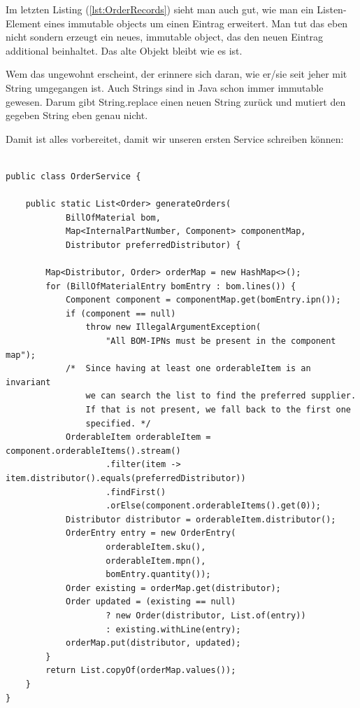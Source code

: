 Im letzten Listing (\ref{lst:OrderRecords}) sieht man auch gut, wie man ein 
Listen-Element eines immutable objects um einen Eintrag erweitert.
Man tut das eben nicht sondern erzeugt ein neues, immutable object, das den
neuen Eintrag additional beinhaltet. Das alte Objekt bleibt wie es ist.

Wem das ungewohnt erscheint, der erinnere sich daran, wie er/sie
seit jeher mit String umgegangen ist. Auch Strings sind in Java schon immer
immutable gewesen. Darum gibt String.replace einen neuen String zurück und 
mutiert den gegeben String eben genau nicht.

Damit ist alles vorbereitet, damit wir unseren ersten Service schreiben können:
\begin{listing}[H]
\begin{verbatim}

public class OrderService {

    public static List<Order> generateOrders(
            BillOfMaterial bom,
            Map<InternalPartNumber, Component> componentMap,
            Distributor preferredDistributor) {

        Map<Distributor, Order> orderMap = new HashMap<>();
        for (BillOfMaterialEntry bomEntry : bom.lines()) {
            Component component = componentMap.get(bomEntry.ipn());
            if (component == null) 
                throw new IllegalArgumentException(
                    "All BOM-IPNs must be present in the component map");
            /*  Since having at least one orderableItem is an invariant
                we can search the list to find the preferred supplier.
                If that is not present, we fall back to the first one 
                specified. */
            OrderableItem orderableItem = component.orderableItems().stream()
                    .filter(item -> item.distributor().equals(preferredDistributor))
                    .findFirst()
                    .orElse(component.orderableItems().get(0));
            Distributor distributor = orderableItem.distributor();
            OrderEntry entry = new OrderEntry(
                    orderableItem.sku(),
                    orderableItem.mpn(),
                    bomEntry.quantity());
            Order existing = orderMap.get(distributor);
            Order updated = (existing == null)
                    ? new Order(distributor, List.of(entry))
                    : existing.withLine(entry);
            orderMap.put(distributor, updated);
        }
        return List.copyOf(orderMap.values());
    }
}
\end{verbatim}
\caption{OrderService mit generateOrders als \textit{pure function}}
\label{lst:oserServicepure}
\end{listing}

